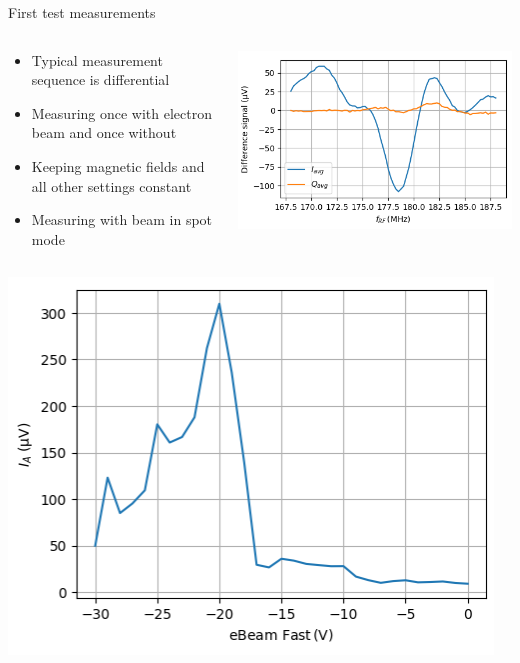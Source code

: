 \documentclass[final]{beamer}
\begin{document}
\begin{frame}[fragile]{}
\begin{columns}[T]
\begin{column}{.49\linewidth}
	\begin{block}{\Large First test measurements}
		\begin{columns}
			\begin{column}{0.55\columnwidth}
				\begin{itemize}
					\item Typical measurement sequence is differential
					\item Measuring once with electron beam and once without
					\item Keeping magnetic fields and all other settings constant
					\item Measuring with beam in spot mode
				\end{itemize}
			\end{column}
			\begin{column}{0.35\columnwidth}
				\includegraphics[width=\columnwidth]{./figures/signalsample.png}
			\end{column}
		\end{columns}
		\begin{columns}
			\begin{column}{0.35\columnwidth}
				\includegraphics[width=\columnwidth]{./figures/signaldependence.png}

\end{column}
\end{columns}
\end{block}
\end{column}
\end{columns}
\end{frame}
\end{document}
